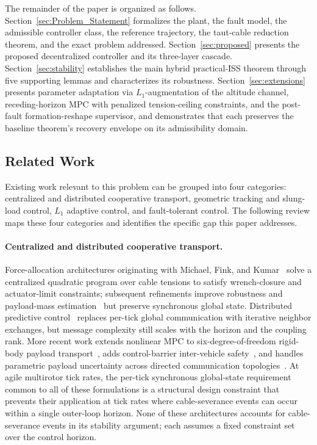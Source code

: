 The remainder of the paper is organized as follows. Section~\ref{sec:Problem_Statement} formalizes the plant, the fault model, the admissible controller class, the reference trajectory, the taut-cable reduction theorem, and the exact problem addressed. Section~\ref{sec:proposed} presents the proposed decentralized controller and its three-layer cascade. Section~\ref{sec:stability} establishes the main hybrid practical-ISS theorem through five supporting lemmas and characterizes its robustness. Section~\ref{sec:extensions} presents parameter adaptation via $L_1$-augmentation of the altitude channel, receding-horizon MPC with penalized tension-ceiling constraints, and the post-fault formation-reshape supervisor, and demonstrates that each preserves the baseline theorem's recovery envelope on its admissibility domain.

\subsection{Related Work}
\label{sec:related-work}

Existing work relevant to this problem can be grouped into four categories: centralized and distributed cooperative transport, geometric tracking and slung-load control, $L_1$ adaptive control, and fault-tolerant control. The following review maps these four categories and identifies the specific gap this paper addresses.

\paragraph{Centralized and distributed cooperative transport.} Force-allocation architectures originating with Michael, Fink, and Kumar~\cite{Michael2011} solve a centralized quadratic program over cable tensions to satisfy wrench-closure and actuator-limit constraints; subsequent refinements improve robustness and payload-mass estimation~\cite{Fink2011, Tagliabue2019} but preserve synchronous global state. Distributed predictive control~\cite{WangOng2017} replaces per-tick global communication with iterative neighbor exchanges, but message complexity still scales with the horizon and the coupling rank. More recent work extends nonlinear MPC to six-degree-of-freedom rigid-body payload transport~\cite{LiLoianno2023}, adds control-barrier inter-vehicle safety~\cite{PallarLi2025}, and handles parametric payload uncertainty across directed communication topologies~\cite{SuBhowmick2023}. At agile multirotor tick rates, the per-tick synchronous global-state requirement common to all of these formulations is a structural design constraint that prevents their application at tick rates where cable-severance events can occur within a single outer-loop horizon. None of these architectures accounts for cable-severance events in its stability argument; each assumes a fixed constraint set over the control horizon.

